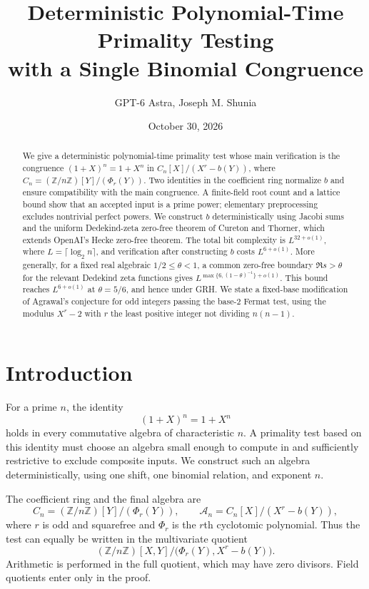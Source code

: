 \documentclass[11pt]{article}
\title{Deterministic Polynomial-Time Primality Testing\\with a Single Binomial Congruence}
\author{GPT-6 Astra, Joseph M. Shunia}
\date{October 30, 2026}
\theoremstyle{definition}
\theoremstyle{remark}
\newcommand{\Z}{\mathbb Z}
\newcommand{\A}{\mathcal A}
\begin{document}
\maketitle

\begin{abstract}
We give a deterministic polynomial-time primality test whose main
verification is the congruence $(1+X)^n=1+X^n$ in $C_n[X]/(X^r-b(Y))$, where
$C_n=(\Z/n\Z)[Y]/(\Phi_r(Y))$. Two identities in the coefficient
ring normalize $b$ and ensure compatibility with the main congruence.
A finite-field root count and a lattice bound show that an accepted
input is a prime power; elementary preprocessing excludes nontrivial
perfect powers. We construct $b$ deterministically using Jacobi sums
and the uniform Dedekind-zeta zero-free theorem of Cureton and Thorner,
which extends OpenAI's Hecke zero-free theorem. The total bit complexity
is $L^{32+o(1)}$, where $L=\lceil\log_2 n\rceil$, and verification
after constructing $b$ costs $L^{6+o(1)}$. More generally, for a fixed
real algebraic $1/2\le\theta<1$, a common zero-free boundary
$\Re s>\theta$ for the relevant Dedekind zeta functions gives
$L^{\max\{6,(1-\theta)^{-1}\}+o(1)}$. This bound reaches
$L^{6+o(1)}$ at $\theta=5/6$, and hence under GRH. We state a fixed-base modification of
Agrawal's conjecture for odd integers passing the base-$2$ Fermat
test, using the modulus $X^r-2$ with $r$ the least positive integer
not dividing $n(n-1)$.
\end{abstract}

\section{Introduction}

For a prime $n$, the identity
\begin{equation}\label{eq:frobenius-intro}
 (1+X)^n=1+X^n
\end{equation}
holds in every commutative algebra of characteristic $n$. A primality
test based on this identity must choose an algebra small enough to
compute in and sufficiently restrictive to exclude composite inputs.
We construct such an algebra deterministically, using one shift, one
binomial relation, and exponent $n$.

The coefficient ring and the final algebra are
\begin{equation}\label{eq:rings-intro}
 C_n=(\Z/n\Z)[Y]/(\Phi_r(Y)),\qquad
 \A_n=C_n[X]/(X^r-b(Y)),
\end{equation}
where $r$ is odd and squarefree and $\Phi_r$ is the $r$th cyclotomic
polynomial. Thus the test can equally be written in the multivariate
quotient
\[
 (\Z/n\Z)[X,Y]/\bigl(\Phi_r(Y),X^r-b(Y)\bigr).
\]
Arithmetic is performed in the full quotient, which may have zero
divisors. Field quotients enter only in the proof.
\end{document}
